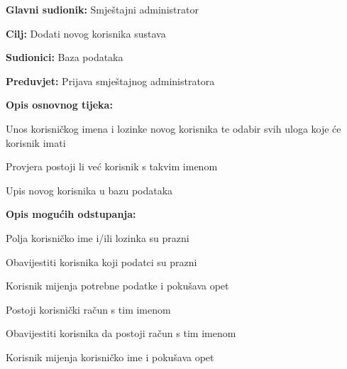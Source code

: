 				\noindent {}
				\begin{packed_item}
					
					\item \textbf{Glavni sudionik: }Smještajni administrator
					\item  \textbf{Cilj:} Dodati novog korisnika sustava
					\item  \textbf{Sudionici:} Baza podataka
					\item  \textbf{Preduvjet:} Prijava smještajnog administratora
					\item  \textbf{Opis osnovnog tijeka:}
					
					\item[] \begin{packed_enum}
						
						\item Unos korisničkog imena i lozinke novog korisnika te odabir svih uloga koje će korisnik imati
						\item Provjera postoji li već korisnik s takvim imenom
						\item Upis novog korisnika u bazu podataka
					\end{packed_enum}
					
					\item  \textbf{Opis mogućih odstupanja:}
					
					\item[] \begin{packed_item}
						
						\item[2.a] Polja korisničko ime i/ili lozinka su prazni
						\item[] \begin{packed_enum}
							
							\item Obavijestiti korisnika koji podatci su prazni
							\item Korisnik mijenja potrebne podatke i pokušava opet
							
						\end{packed_enum}
						\item[2.b] Postoji korisnički račun s tim imenom
						\item[] \begin{packed_enum}
							
							\item Obavijestiti korisnika da postoji račun s tim imenom
							\item Korisnik mijenja korisničko ime i pokušava opet
							

\end{packed_enum}
\end{packed_item}
\end{packed_item}
